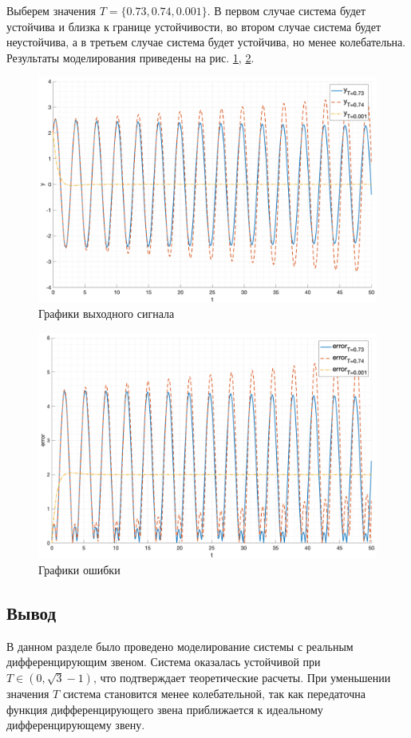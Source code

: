 Выберем значения $T = \{0.73, 0.74, 0.001\}$. В первом случае система будет устойчива и близка к границе устойчивости,
во втором случае система будет неустойчива, а в третьем случае система будет устойчива, но менее колебательна.
Результаты моделирования приведены на рис. \ref{fig:task2_out}, \ref{fig:task2_err}.
\begin{figure}[ht!]
    \centering
    \includegraphics[width=\textwidth]{media/plots/task2_out.png}
    \caption{Графики выходного сигнала}
    \label{fig:task2_out}
\end{figure}

\begin{figure}
    \centering
    \includegraphics[width=\textwidth]{media/plots/task2_error.png}
    \caption{Графики ошибки}
    \label{fig:task2_err}
\end{figure}


\subsection{Вывод}
В данном разделе было проведено моделирование системы с реальным дифференцирующим звеном. 
Система оказалась устойчивой при $T \in (0, \sqrt{3} - 1)$, что подтверждает теоретические расчеты. 
При уменьшении значения $T$ система становится менее колебательной, так как передаточна 
функция дифференцирующего звена приближается к идеальному дифференцирующему звену. 
